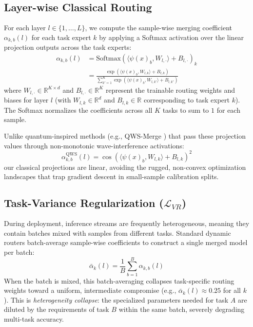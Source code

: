 \subsection{Layer-wise Classical Routing}
For each layer $l \in \{1, \dots, L\}$, we compute the sample-wise merging coefficient $\alpha_{k, b}(l)$ for each task expert $k$ by applying a Softmax activation over the linear projection outputs across the task experts:
\begin{equation}
\begin{aligned}
    \alpha_{k, b}(l) &= \text{Softmax}\left( \langle \psi(x)_b, W_{l, \cdot} \rangle + B_{l, \cdot} \right)_k \\
    &= \frac{\exp\left( \langle \psi(x)_b, W_{l, k} \rangle + B_{l, k} \right)}{\sum_{k'=1}^K \exp\left( \langle \psi(x)_b, W_{l, k'} \rangle + B_{l, k'} \right)}
\end{aligned}
\end{equation}
where $W_{l, \cdot} \in \mathbb{R}^{K \times d}$ and $B_{l, \cdot} \in \mathbb{R}^K$ represent the trainable routing weights and biases for layer $l$ (with $W_{l, k} \in \mathbb{R}^d$ and $B_{l, k} \in \mathbb{R}$ corresponding to task expert $k$). The Softmax normalizes the coefficients across all $K$ tasks to sum to $1$ for each sample.

Unlike quantum-inspired methods (e.g., QWS-Merge \cite{qwsmerge2025}) that pass these projection values through non-monotonic wave-interference activations:
\begin{equation}
    \alpha^{\text{QWS}}_{k, b}(l) = \cos\left( \langle \psi(x)_b, W_{l, k} \rangle + B_{l, k} \right)^2
\end{equation}
our classical projections are linear, avoiding the rugged, non-convex optimization landscapes that trap gradient descent in small-sample calibration splits.

\subsection{Task-Variance Regularization ($\mathcal{L}_{VR}$)}
\label{subsec:vr_loss}

During deployment, inference streams are frequently heterogeneous, meaning they contain batches mixed with samples from different tasks. Standard dynamic routers batch-average sample-wise coefficients to construct a single merged model per batch:
\begin{equation}
    \bar{\alpha}_k(l) = \frac{1}{B} \sum_{b=1}^B \alpha_{k, b}(l)
\end{equation}
When the batch is mixed, this batch-averaging collapses task-specific routing weights toward a uniform, intermediate compromise (e.g., $\bar{\alpha}_k(l) \approx 0.25$ for all $k$). This is \emph{heterogeneity collapse}: the specialized parameters needed for task $A$ are diluted by the requirements of task $B$ within the same batch, severely degrading multi-task accuracy.

